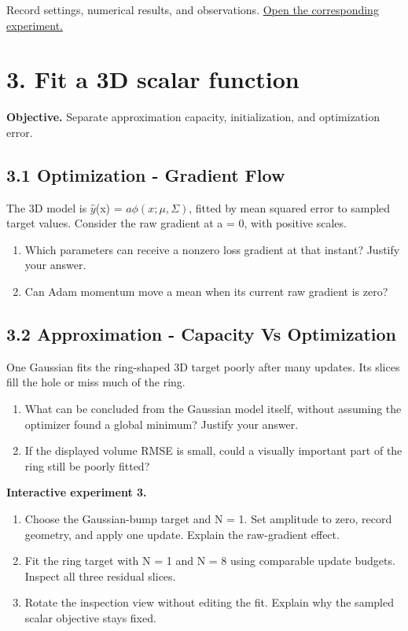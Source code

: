 \documentclass[11pt,a4paper]{article}
\begin{document}
Record settings, numerical results, and observations.
\href{https://sosekie.github.io/Unibe-CVG-CV-Interactive-Labs/tutorial-09/#dimensions}{Open the corresponding experiment.}\par
{}\section*{3. Fit a 3D scalar function}
\noindent\textbf{Objective.} Separate approximation capacity, initialization, and optimization error.
\subsection*{3.1 Optimization - Gradient Flow}
The 3D model is $\hat{y}$(x) = $a\phi(x;\mu,\Sigma)$, fitted by mean squared error to sampled target values.
Consider the raw gradient at a = 0, with positive scales.
\begin{enumerate}[label=(\alph*),nosep]
\item Which parameters can receive a nonzero loss gradient at that instant?
Justify your answer.
\item Can Adam momentum move a mean when its current raw gradient is zero?
\end{enumerate}
\subsection*{3.2 Approximation - Capacity Vs Optimization}
One Gaussian fits the ring-shaped 3D target poorly after many updates.
Its slices fill the hole or miss much of the ring.
\begin{enumerate}[label=(\alph*),nosep]
\item What can be concluded from the Gaussian model itself, without assuming the optimizer found a global minimum?
Justify your answer.
\item If the displayed volume RMSE is small, could a visually important part of the ring still be poorly fitted?
\end{enumerate}
\noindent\textbf{Interactive experiment 3.}\begin{enumerate}[nosep]
\item Choose the Gaussian-bump target and N = 1.
Set amplitude to zero, record geometry, and apply one update.
Explain the raw-gradient effect.
\item Fit the ring target with N = 1 and N = 8 using comparable update budgets.
Inspect all three residual slices.
\item Rotate the inspection view without editing the fit.
Explain why the sampled scalar objective stays fixed.
\end{enumerate}
\end{document}
